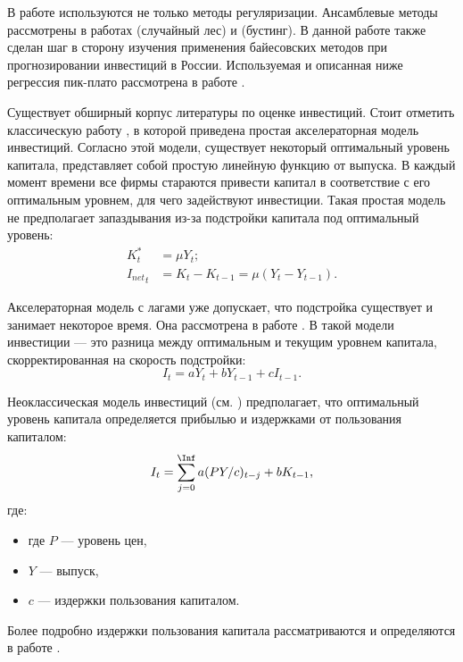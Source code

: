  
 В работе используются не только методы регуляризации. Ансамблевые методы рассмотрены в работах \cite{breiman2001random} (случайный лес) и \cite{efron1994introduction} (бустинг). В данной работе также сделан шаг в сторону изучения применения байесовских методов при прогнозировании инвестиций в России. Используемая и описанная ниже регрессия пик-плато рассмотрена в работе \cite{ishwaran2005spike}.

Существует обширный корпус литературы по оценке инвестиций. Стоит отметить классическую работу \cite{clark1917business}, в которой приведена простая акселераторная модель инвестиций. Согласно этой модели, существует некоторый оптимальный уровень капитала, представляет собой простую линейную функцию от выпуска. В каждый момент времени все фирмы стараются привести капитал в соответствие с его оптимальным уровнем, для чего задействуют инвестиции. Такая простая модель не предполагает запаздывания из-за подстройки капитала под оптимальный уровень:
\begin{align}
    K_t^* &= \mu Y_t;\\
    {I_{net}}_t &= K_t - K_{t-1} = \mu(Y_t - Y_{t-1}).
\end{align}


Акселераторная модель с лагами уже допускает, что подстройка существует и занимает некоторое время. Она рассмотрена в работе \cite{guitton1955koyck}.
В такой модели инвестиции --- это разница между оптимальным и текущим уровнем капитала, скорректированная на скорость подстройки:
\begin{equation}
    I_t = a Y_t + b Y_{t-1} + c I_{t-1}.
\end{equation}


Неоклассическая модель инвестиций (см. \cite{jorgenson1963capital}) предполагает, что оптимальный уровень капитала определяется прибылью и издержками от пользования капиталом:
\begin{equation}
    I_t = \sum_{j = 0}^{\Inf}a (P Y/c)_{t-j} + b K_{t-1},
\end{equation}
где:
\begin{itemize}
    \item где $P$ --- уровень цен,
    \item $Y$ --- выпуск,
    \item $c$ --- издержки пользования капиталом.
\end{itemize}

Более подробно издержки пользования капитала рассматриваются и определяются в работе \cite{christensen1969measurement}.

